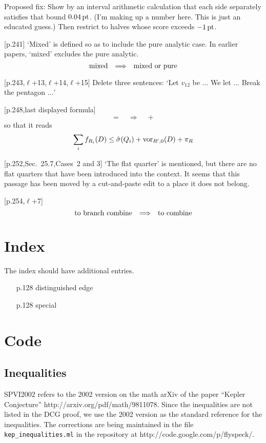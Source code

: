 \documentclass[11pt]{amsart}
\def\op#1{{\text{#1}}}
\def\to{{\quad\Longrightarrow\quad}}
\def\line{$\ell$}
\def\text{\hbox}
\begin{document}
Proposed fix: Show by an interval arithmetic
calculation that each side separately satisfies
that bound $0.04\,\text{pt}$. (I'm making up
a number here.  This is just an educated guess.)
Then restrict to halves whose score exceeds
$-1\,\text{pt}$.

[p.241]  `Mixed' is defined so as to include
the pure analytic case.  In earlier papers,
`mixed' excludes the pure analytic.  
	$$
	\text{mixed}\to\text{mixed or pure}
	$$
	
[p.243,\line+13,\line+14,\line+15]
	Delete three sentences:
	`Let $v_{12}$ be $\ldots$  We let $\ldots$
	 Break the pentagon $\ldots$'
	
[p.248,last displayed formula]  
	$$
	= \to +
	$$
so that it reads
	$$
	\sum_i f_{R_i}(D) \le \hat\sigma(Q_i) +
	\op{vor}_{R',0}(D) + \pi_R
	$$

[p.252,Sec.~25.7,Cases~2 and 3]  `The flat quarter'
is mentioned, but there are no flat quarters
that have been introduced into the context.  
It seems that this passage
has been moved by a cut-and-paste edit to a
place it does not belong.

[p.254,\line+7]
	$$
	\text{to branch combine} \to \text{to combine}
	$$




\section{Index}

The index should have additional entries.
\begin{itemize}
	\item [p.128] distinguished edge
	\item [p.128] special
\end{itemize}

\section{Code}

\subsection{Inequalities}  

SPVI2002 refers to the 2002 version on the math arXiv of the paper
``Kepler Conjecture''  http://arxiv.org/pdf/math/9811078.
Since the inequalities are not listed in the DCG proof, we use the 2002 version as the standard reference for the inequalities.  The corrections are being maintained in the file {\tt kep\_inequalities.ml} in the repository at http://code.google.com/p/flyspeck/.
\end{document}

